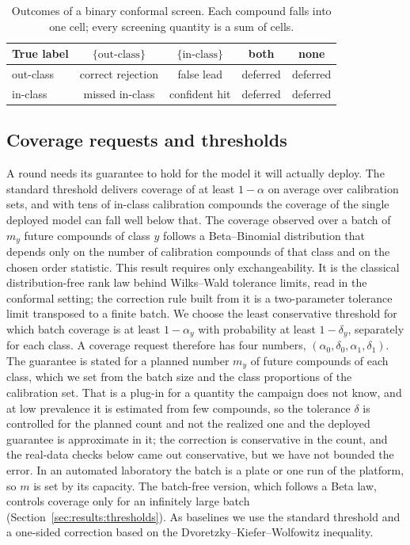 \documentclass[twocolumn,10pt]{article}
\begin{document}
\begin{table}[t]
\centering
\caption{Outcomes of a binary conformal screen. Each compound falls into one cell; every screening quantity is a sum of cells.}
\label{tab:outcomes}
\small
\begin{tabular}{@{}lcccc@{}}
\toprule
True label & $\{\text{out-class}\}$ & $\{\text{in-class}\}$ & both & none \\
\midrule
out-class & correct rejection & false lead & deferred & deferred \\
in-class   & missed in-class & confident hit & deferred & deferred \\
\bottomrule
\end{tabular}
\end{table}

\subsection{Coverage requests and thresholds}
\label{sec:methods:thresholds}

A round needs its guarantee to hold for the model it will actually deploy. The standard threshold delivers coverage of at least $1-\alpha$ on average over calibration sets, and with tens of in-class calibration compounds the coverage of the single deployed model can fall well below that. The coverage observed over a batch of $m_y$ future compounds of class $y$ follows a Beta--Binomial distribution that depends only on the number of calibration compounds of that class and on the chosen order statistic. This result requires only exchangeability. It is the classical distribution-free rank law behind Wilks--Wald tolerance limits, read in the conformal setting;\citep{Wilks1941,Vovk2012PAC,Marques2025Beta} the correction rule built from it is a two-parameter tolerance limit transposed to a finite batch. We choose the least conservative threshold for which batch coverage is at least $1-\alpha_y$ with probability at least $1-\delta_y$, separately for each class. A coverage request therefore has four numbers, $(\alpha_0,\delta_0,\alpha_1,\delta_1)$. The guarantee is stated for a planned number $m_y$ of future compounds of each class, which we set from the batch size and the class proportions of the calibration set. That is a plug-in for a quantity the campaign does not know, and at low prevalence it is estimated from few compounds, so the tolerance $\delta$ is controlled for the planned count and not the realized one and the deployed guarantee is approximate in it; the correction is conservative in the count, and the real-data checks below came out conservative, but we have not bounded the error. In an automated laboratory the batch is a plate or one run of the platform, so $m$ is set by its capacity. The batch-free version,\citep{Vovk2012PAC} which follows a Beta law, controls coverage only for an infinitely large batch (Section~\ref{sec:results:thresholds}). As baselines we use the standard threshold and a one-sided correction based on the Dvoretzky--Kiefer--Wolfowitz inequality.\citep{Massart1990DKWM}
\end{document}
